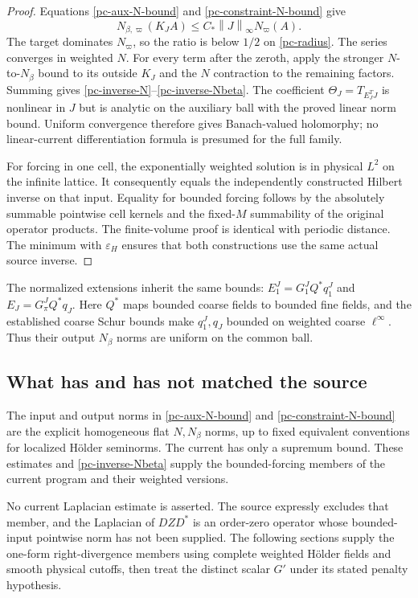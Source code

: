 \documentclass[11pt]{article}
\theoremstyle{remark}
\newcommand{\norm}[1]{\left\|#1\right\|}
\begin{document}
\begin{proof}
Equations \eqref{pc-aux-N-bound} and
\eqref{pc-constraint-N-bound} give
\[
 N_{\beta,\varpi}(K_JA)
          \le C_*\norm{J}_\infty N_\varpi(A).
\]
The target dominates $N_\varpi$, so the ratio is below $1/2$
on \eqref{pc-radius}. The series converges in weighted $N$.
For every term after the zeroth, apply the stronger $N$-to-$N_\beta$
bound to its outside $K_J$ and the $N$ contraction to the remaining
factors. Summing gives \eqref{pc-inverse-N}--\eqref{pc-inverse-Nbeta}.
The coefficient $\Theta_J=T_{E_J^TJ}$ is nonlinear in $J$ but is
analytic on the auxiliary ball with the proved linear norm bound.
Uniform convergence therefore gives Banach-valued holomorphy; no
linear-current differentiation formula is presumed for the full family.

For forcing in one cell, the exponentially weighted solution is in
physical $L^2$ on the infinite lattice. It consequently equals the
independently constructed Hilbert inverse on that input. Equality
for bounded forcing follows by the absolutely summable pointwise
cell kernels and the fixed-$M$ summability of the original operator
products. The finite-volume proof is identical with periodic
distance. The minimum with $\varepsilon_H$ ensures that both
constructions use the same actual source inverse.
\end{proof}

The normalized extensions inherit the same bounds:
$E_1^J=G_1^JQ^*q_1^J$ and $E_J=G_\pi^JQ^*q_J$.
Here $Q^*$ maps bounded coarse fields to bounded fine fields, and
the established coarse Schur bounds make $q_1^J,q_J$ bounded on
weighted coarse $\ell^\infty$. Thus their output $N_\beta$ norms
are uniform on the common ball.

\subsection{What has and has not matched the source}

The input and output norms in \eqref{pc-aux-N-bound} and
\eqref{pc-constraint-N-bound} are the explicit homogeneous flat
$N,N_\beta$ norms, up to fixed equivalent conventions for localized
H\"older seminorms. The current has only a supremum bound. These
estimates and \eqref{pc-inverse-Nbeta} supply the bounded-forcing
members of the current program and their weighted versions.

No current Laplacian estimate is asserted. The source expressly
excludes that member, and the Laplacian of $DZD^*$ is an order-zero
operator whose bounded-input pointwise norm has not been supplied.
The following sections supply the one-form right-divergence members
using complete weighted H\"older fields and smooth physical
cutoffs, then treat the distinct scalar $G'$ under its stated
penalty hypothesis.
\end{document}
